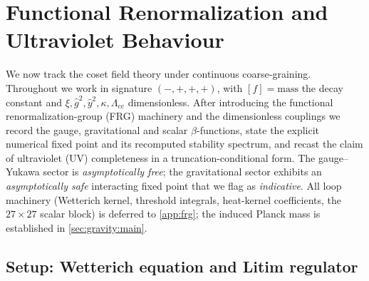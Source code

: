 \documentclass[11pt]{article}
\theoremstyle{plain}
\theoremstyle{definition}
\theoremstyle{remark}
\begin{document}
\section{Functional Renormalization and Ultraviolet Behaviour}
\label{sec:frg:main}

We now track the coset field theory under continuous coarse-graining.
Throughout we work in signature $(-,+,+,+)$, with $[f]=\text{mass}$ the
decay constant and $\xi,\hat g^{2},\hat y^{2},\kappa,\Lambda_{\mathrm{cc}}$
dimensionless. After introducing the functional renormalization-group
(FRG) machinery and the dimensionless couplings we record the gauge,
gravitational and scalar $\beta$-functions, state the explicit numerical
fixed point and its recomputed stability spectrum, and recast the claim of
ultraviolet (UV) completeness in a truncation-conditional form.
The gauge--Yukawa sector is \emph{asymptotically free}; the gravitational
sector exhibits an \emph{asymptotically safe} interacting fixed point that
we flag as \emph{indicative}. All loop machinery (Wetterich kernel,
threshold integrals, heat-kernel coefficients, the $27\times27$ scalar
block) is deferred to \autoref{app:frg}; the induced Planck mass is
established in \autoref{sec:gravity:main}.

\subsection{Setup: Wetterich equation and Litim regulator}
\label{sec:frg:setup}
\end{document}
